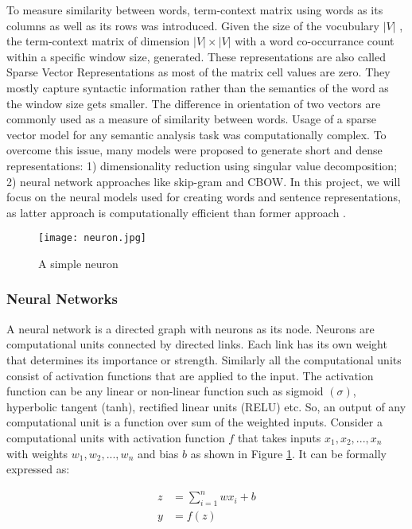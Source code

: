 \documentclass[12pt]{report} %
\begin{document}
To measure similarity between words, term-context matrix using words as its columns as well as its rows was introduced. Given the size of the vocubulary $|V|$ , the term-context matrix of dimension $|V| \times |V|$ with a word co-occurrance count within a specific window size,  generated. These representations are also called Sparse Vector Representations as most of the matrix cell values are zero. They mostly capture syntactic information rather than the semantics of the word as the window size gets smaller. The difference in orientation of two vectors are commonly used as a measure of similarity between words. Usage of a sparse vector model for any semantic analysis task was computationally complex. To overcome this issue, many models were proposed to generate short and dense representations: 1) dimensionality reduction using singular value decomposition; 2) neural network approaches like skip-gram and CBOW. In this project, we will focus on the neural models used for creating words and sentence representations, as latter approach is computationally efficient than former approach \citep{jurafsky2014speech}.

\begin{figure}[!tbp]
	\centering
	\texttt{[image: neuron.jpg]}
	\caption{A simple neuron}
	\label{neuron}
\end{figure}

\subsubsection{Neural Networks}

A neural network is a directed graph with neurons as its node. Neurons are computational units connected by directed links. Each link has its own weight that determines its importance or strength. Similarly all the computational units consist of activation functions that are applied to the input. The activation function can be any linear or non-linear function such as sigmoid $(\sigma)$, hyperbolic tangent (tanh), rectified linear units (RELU) etc. So, an output of any computational unit is a function over sum of the weighted inputs. Consider a computational units with activation function $f$ that takes inputs $x_{1},x_{2},...,x_{n}$ with weights $w_{1},w_{2},...,w_{n}$ and bias $b$ as shown in Figure \ref{neuron}. It can be  formally expressed as:


\begin{align}
z & = \sum_{i=1}^{n} wx_i + b \\
y & = f(z)
\end{align}
\end{document}
